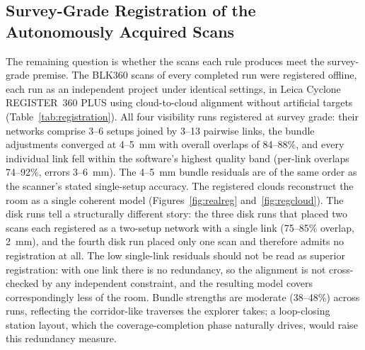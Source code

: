 \subsection{Survey-Grade Registration of the Autonomously Acquired Scans}
\label{subsec:exp-registration}

The remaining question is whether the scans each rule produces meet the
survey-grade premise. The BLK360 scans of every completed run were registered
offline, each run as an independent project under identical settings, in Leica
Cyclone REGISTER~360 PLUS using cloud-to-cloud alignment without artificial
targets (Table~\ref{tab:registration}). All four visibility runs registered at
survey grade: their networks comprise 3--6 setups joined by 3--13 pairwise
links, the bundle adjustments converged at 4--5~mm with overall overlaps of
84--88\%, and every individual link fell within the software's highest quality
band (per-link overlaps 74--92\%, errors 3--6~mm). The 4--5~mm bundle
residuals are of the same order as the scanner's stated single-setup accuracy.
The registered clouds reconstruct the room as a single coherent model
(Figures~\ref{fig:realreg} and~\ref{fig:regcloud}). The disk runs tell a
structurally different story: the three disk runs that placed two scans each
registered as a two-setup network with a single link (75--85\% overlap,
2~mm), and the fourth disk run placed only one scan and therefore admits no
registration at all. The low single-link residuals should not be read as
superior registration: with one link there is no redundancy, so the alignment
is not cross-checked by any independent constraint, and the resulting model
covers correspondingly less of the room. Bundle strengths are moderate
(38--48\%) across runs, reflecting the corridor-like traverses the explorer
takes; a loop-closing station layout, which the coverage-completion phase
naturally drives, would raise this redundancy measure.

